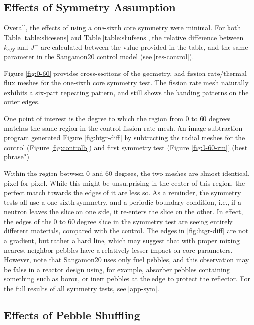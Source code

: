 \subsection{Effects of Symmetry Assumption}
\label{res-sym}

Overall, the effects of using a one-sixth core symmetry were minimal.  For both Table \ref{table:slicesens} and Table \ref{table:shufsens}, the relative difference between $k_{eff}$ and $J^+$ are calculated between the value provided in the table, and the same parameter in the Sangamon20 control model (see \autoref{res-control}).




Figure \ref{fig:0-60} provides cross-sections of the geometry, and fission rate/thermal flux meshes for the one-sixth core symmetry test.  The fission rate mesh naturally exhibits a six-part repeating pattern, and still shows the banding patterns on the outer edges. 



One point of interest is the degree to which the region from 0 to 60 degrees matches the same region in the control fission rate mesh.  An image subtraction program generated Figure \ref{fig:htgr-diff} by subtracting the radial meshes for the control (Figure \ref{fig:controlb}) and first symmetry test (Figure \ref{fig:0-60-rm}).(best phrase?)



Within the region between 0 and 60 degrees, the two meshes are almost identical, pixel for pixel.  While this might be unsurprising in the center of this region, the perfect match towards the edges of it are less so.  As a reminder, the symmetry tests all use a one-sixth symmetry, and a periodic boundary condition, i.e., if a neutron leaves the slice on one side, it re-enters the slice on the other.  In effect, the edges of the 0 to 60 degree slice in the symmetry test are seeing entirely different materials, compared with the control.  The edges in \ref{fig:htgr-diff} are not a gradient, but rather a hard line, which may suggest that with proper mixing nearest-neighbor pebbles have a relatively lesser impact on core parameters.  However, note that Sangamon20 uses only fuel pebbles, and this observation may be false in a reactor design using, for example, absorber pebbles containing something such as boron, or inert pebbles at the edge to protect the reflector.  For the full results of all symmetry tests, see \autoref{app-sym}.


\subsection{Effects of Pebble Shuffling}
\label{res-shuff}

